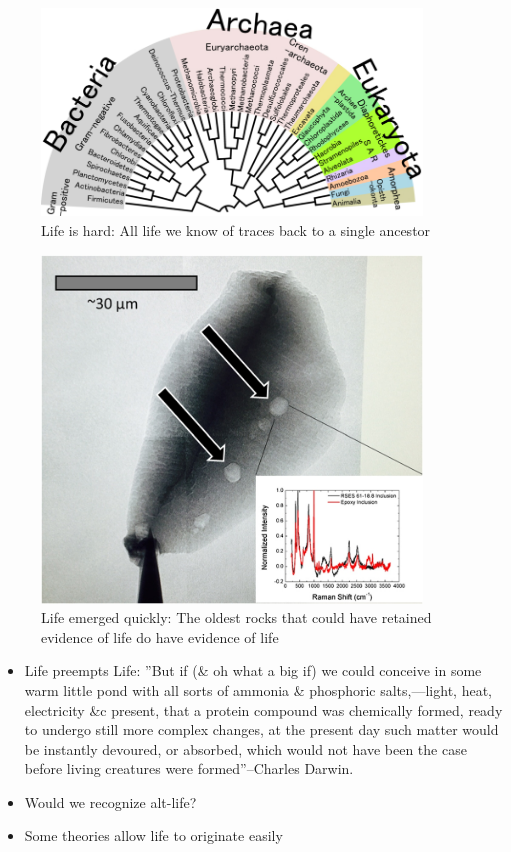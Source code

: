 \documentclass[]{article}
\begin{document}
\begin{figure}[H]
	\caption{Life is hard: All life we know of traces back to a single 		ancestor}\label{fig:luca} 
	\includegraphics[width=0.9\textwidth]{Luca}
\end{figure}

\begin{figure}[H]
	\caption{Life emerged quickly: The oldest rocks that could have retained evidence of life do have evidence of life\cite{bell2015potentially}}\label{fig:zircons} 
	\includegraphics[width=0.9\textwidth]{Zircons}
\end{figure}

\begin{itemize}
	\item Life preempts Life: ''But if (\& oh what a big if) we could conceive in some warm little pond with all sorts of ammonia \& phosphoric salts,—light, heat, electricity \&c present, that a protein compound was chemically formed, ready to undergo still more complex changes, at the present day such matter would be instantly devoured, or absorbed, which would not have been the case before living creatures were formed''--Charles Darwin\cite{darwin1871letter}.
	
	\item Would we recognize alt-life?
	
	\item Some theories allow life to originate easily\cite{wachtershauser1988before}
\end{itemize}
\end{document}
